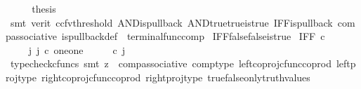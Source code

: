 \begin{isabellebody}
\ \ \isamarkupfalse%
\ \isamarkupfalse%
\ {\isacharquery}{\kern0pt}thesis\ \isanewline
\ \ \ \ \isamarkupfalse%
\ {\isacharparenleft}{\kern0pt}smt\ {\isacharparenleft}{\kern0pt}verit{\isacharcomma}{\kern0pt}\ ccfv{\isacharunderscore}{\kern0pt}threshold{\isacharparenright}{\kern0pt}\ AND{\isacharunderscore}{\kern0pt}is{\isacharunderscore}{\kern0pt}pullback\ AND{\isacharunderscore}{\kern0pt}true{\isacharunderscore}{\kern0pt}true{\isacharunderscore}{\kern0pt}is{\isacharunderscore}{\kern0pt}true\ IFF{\isacharunderscore}{\kern0pt}is{\isacharunderscore}{\kern0pt}pullback\ comp{\isacharunderscore}{\kern0pt}associative{}\ is{\isacharunderscore}{\kern0pt}pullback{\isacharunderscore}{\kern0pt}def\ \ terminal{\isacharunderscore}{\kern0pt}func{\isacharunderscore}{\kern0pt}comp{\isacharparenright}{\kern0pt}\isanewline
{}\isamarkupfalse%
%
\endisatagproof
{\isafoldproof}%
%
\isadelimproof
\isanewline
%
\endisadelimproof
\isanewline
{}\isamarkupfalse%
\ IFF{\isacharunderscore}{\kern0pt}false{\isacharunderscore}{\kern0pt}false{\isacharunderscore}{\kern0pt}is{\isacharunderscore}{\kern0pt}true{\isacharcolon}{\kern0pt}\isanewline
\ {\isachardoublequoteopen}IFF\ {\isasymcirc}\isactrlsub c\ {\isasymlangle}{\isasymf}{\isacharcomma}{\kern0pt}{\isasymf}{\isasymrangle}\ {\isacharequal}{\kern0pt}\ {\isasymt}{\isachardoublequoteclose}\isanewline
%
\isadelimproof
%
\endisadelimproof
%
\isatagproof
{}\isamarkupfalse%
\ {\isacharminus}{\kern0pt}\ \isanewline
\ \ \isamarkupfalse%
\ {\isachardoublequoteopen}{\isasymexists}\ j{\isachardot}{\kern0pt}\ j\ {\isasymin}\isactrlsub c\ {\isacharparenleft}{\kern0pt}one{\isasymCoprod}one{\isacharparenright}{\kern0pt}\ {\isasymand}\ {\isacharparenleft}{\kern0pt}{\isasymlangle}{\isasymt}{\isacharcomma}{\kern0pt}\ {\isasymt}{\isasymrangle}\ {\isasymamalg}{\isasymlangle}{\isasymf}{\isacharcomma}{\kern0pt}\ {\isasymf}{\isasymrangle}{\isacharparenright}{\kern0pt}\ {\isasymcirc}\isactrlsub c\ j\ \ {\isacharequal}{\kern0pt}\ {\isasymlangle}{\isasymf}{\isacharcomma}{\kern0pt}{\isasymf}{\isasymrangle}{\isachardoublequoteclose}\isanewline
\ \ \ \ \isamarkupfalse%
\ {\isacharparenleft}{\kern0pt}typecheck{\isacharunderscore}{\kern0pt}cfuncs{\isacharcomma}{\kern0pt}\ smt\ {\isacharparenleft}{\kern0pt}z{}{\isacharparenright}{\kern0pt}\ \ comp{\isacharunderscore}{\kern0pt}associative{}\ comp{\isacharunderscore}{\kern0pt}type\ left{\isacharunderscore}{\kern0pt}coproj{\isacharunderscore}{\kern0pt}cfunc{\isacharunderscore}{\kern0pt}coprod\ left{\isacharunderscore}{\kern0pt}proj{\isacharunderscore}{\kern0pt}type\ right{\isacharunderscore}{\kern0pt}coproj{\isacharunderscore}{\kern0pt}cfunc{\isacharunderscore}{\kern0pt}coprod\ right{\isacharunderscore}{\kern0pt}proj{\isacharunderscore}{\kern0pt}type\ true{\isacharunderscore}{\kern0pt}false{\isacharunderscore}{\kern0pt}only{\isacharunderscore}{\kern0pt}truth{\isacharunderscore}{\kern0pt}values{\isacharparenright}{\kern0pt}\isanewline

\end{isabellebody}
